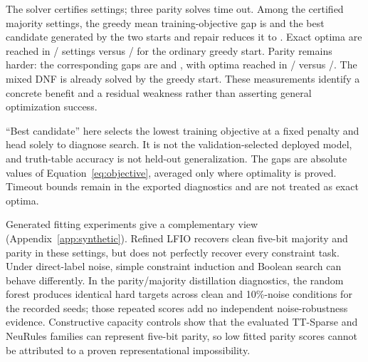 \documentclass[a4paper,fleqn,review]{cas-sc}
\newcommand{\kbsbarrier}{\FloatBarrier}
\newcommand{\kbsbarrier}{}
\begin{document}
The solver certifies \CertifiedSettings{} settings; three parity solves time out. Among the certified majority settings, the greedy mean training-objective gap is \MajorityOldGap{} and the best candidate generated by the two starts and repair reduces it to \MajorityNewGap{}. Exact optima are reached in \MajorityNewOptimal/\MajorityCertified{} settings versus \MajorityOldOptimal/\MajorityCertified{} for the ordinary greedy start. Parity remains harder: the corresponding gaps are \ParityOldGap{} and \ParityNewGap{}, with optima reached in \ParityNewOptimal/\ParityCertified{} versus \ParityOldOptimal/\ParityCertified{}. The mixed DNF is already solved by the greedy start. These measurements identify a concrete benefit and a residual weakness rather than asserting general optimization success.

``Best candidate'' here selects the lowest training objective at a fixed penalty and head solely to diagnose search. It is not the validation-selected deployed model, and truth-table accuracy is not held-out generalization. The gaps are absolute values of Equation~\ref{eq:objective}, averaged only where optimality is proved. Timeout bounds remain in the exported diagnostics and are not treated as exact optima.

Generated fitting experiments give a complementary view (Appendix~\ref{app:synthetic}). Refined LFIO recovers clean five-bit majority and parity in these settings, but does not perfectly recover every constraint task. Under direct-label noise, simple constraint induction and Boolean search can behave differently. In the parity/majority distillation diagnostics, the random forest produces identical hard targets across clean and 10\%-noise conditions for the recorded seeds; those repeated scores add no independent noise-robustness evidence. Constructive capacity controls show that the evaluated TT-Sparse and NeuRules families can represent five-bit parity, so low fitted parity scores cannot be attributed to a proven representational impossibility.
\kbsbarrier
\end{document}
